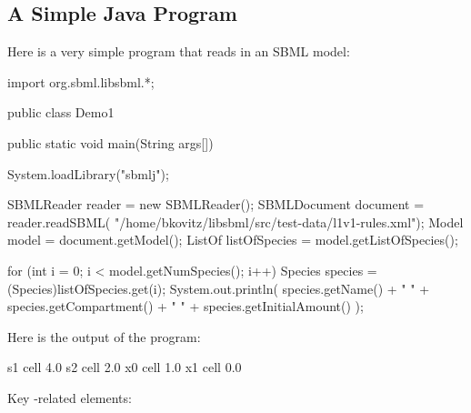 \documentclass{sbmlmanual}
\begin{document}
\subsection{A Simple Java \libsbml{} Program}
\label{sec:simple-java-program}

   Here is a very simple program that reads in an SBML model:

\begin{boxedCodeVerbatim}
import org.sbml.libsbml.*;

public class Demo1
{
   public static void main(String args[])
   {
      System.loadLibrary("sbmlj");

      SBMLReader reader = new SBMLReader();
      SBMLDocument document = reader.readSBML(
         "/home/bkovitz/libsbml/src/test-data/l1v1-rules.xml");
      Model model = document.getModel();
      ListOf listOfSpecies = model.getListOfSpecies();

      for (int i = 0; i < model.getNumSpecies(); i++) {
         Species species = (Species)listOfSpecies.get(i);
         System.out.println(
            species.getName() + "  " +
            species.getCompartment() + "  " +
            species.getInitialAmount()
         );
      }
   }
}
\end{boxedCodeVerbatim}

Here is the output of the program:

\begin{shellVerbatim}
   s1  cell  4.0
   s2  cell  2.0
   x0  cell  1.0
   x1  cell  0.0
\end{shellVerbatim}

Key \libsbml{}-related elements:
\end{document}

